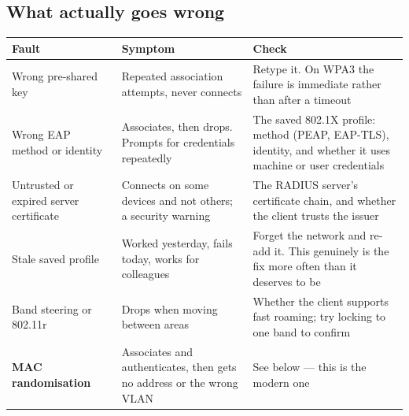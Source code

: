 \subsection{What actually goes wrong}

\begin{longtable}{@{}L{4.3cm}L{5.2cm}L{5.5cm}@{}}
\toprule
{}
\textbf{Fault} & \textbf{Symptom} & \textbf{Check} \\
\midrule
\endhead
Wrong pre-shared key &
Repeated association attempts, never connects &
Retype it. On WPA3 the failure is immediate rather than after a timeout \\
Wrong EAP method or identity &
Associates, then drops. Prompts for credentials repeatedly &
The saved 802.1X profile: method (PEAP, EAP-TLS), identity, and whether it uses
machine or user credentials \\
Untrusted or expired server certificate &
Connects on some devices and not others; a security warning &
The RADIUS server's certificate chain, and whether the client trusts the issuer \\
Stale saved profile &
Worked yesterday, fails today, works for colleagues &
Forget the network and re-add it. This genuinely is the fix more often than it
deserves to be \\
Band steering or 802.11r &
Drops when moving between areas &
Whether the client supports fast roaming; try locking to one band to confirm \\
\textbf{MAC randomisation} &
Associates and authenticates, then gets no address or the wrong VLAN &
See below --- this is the modern one \\
\bottomrule
\end{longtable}

